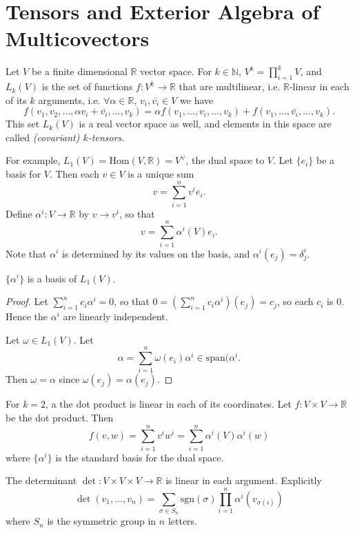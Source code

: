 \section{Tensors and Exterior Algebra of Multicovectors}

Let $V$ be a finite dimensional $\mathbb{R}$ vector space.
For $k \in \mathbb{N}$,
$V^k = \prod_{i=1}^k V$, and
$L_k(V)$ is the set of functions $f: V^k \to \mathbb{R}$ that are
multilinear, i.e. $\mathbb{R}$-linear in each of its $k$ arguments,
i.e. $\forall \alpha \in \mathbb{R}$, $v_i, \bar{v_i} \in V$ we have
$$
  f(v_1, v_2, \dots, \alpha v_i + \bar{v_i}, \dots, v_k)
= \alpha f(v_1, \dots, v_i, \dots, v_k)
+ f(v_1, \dots, \bar{v_i}, \dots, v_k).
$$
This set $L_k(V)$ is a real vector space as well, and elements in this
space are called \emph{(covariant) $k$-tensors}.

For example, $L_1(V) = \mathrm{Hom}(V, \mathbb{R}) = V^\vee$, the dual
space to $V$. Let $\{ e_i \}$ be a basis for $V$. Then each $v \in V$
is a unique sum
$$
  v
= \sum_{i=1}^n v^i e_i.
$$
Define $\alpha^i : V \to \mathbb{R}$ by $v \to v^i$, so that
$$
  v
= \sum_{i=1}^n \alpha^i(V) e_i.
$$
Note that $\alpha^i$ is determined by its values on the basis,
and $\alpha^i(e_j) = \delta_j^i$.

\begin{lemma}
$\{ \alpha^i \}$ is a basis of $L_1(V)$.
\end{lemma}

\begin{proof}
Let $\sum_{i=1}^n c_i \alpha^i = 0$, so that
$0 = \left(\sum_{i=1}^n c_i \alpha^i\right)(e_j) = c_j$,
so each $c_i$ is 0. Hence the $\alpha^i$ are linearly independent.

Let $\omega \in L_1(V)$. Let
$$
  \alpha
= \sum_{i=1}^n \omega(e_i) \alpha^i
\in \mathrm{span}(\alpha^i.
$$
Then $\omega = \alpha$ since $\omega(e_j) = \alpha(e_j)$.
\end{proof}

\begin{xmpl}
For $k = 2$, a the dot product is linear in each of its coordinates.
Let $f : V \times V \to \mathbb{R}$ be the dot product. Then
$$
  f(v, w)
= \sum_{i=1}^n v^i w^i
= \sum_{i=1}^n \alpha^i(V) \alpha^i(w)
$$
where $\{ \alpha^i \}$ is the standard basis for the dual space.
\end{xmpl}

\begin{xmpl}
The determinant $\det : V \times V \times V \to \mathbb{R}$ is linear
in each argument. Explicitly
$$
  \det (v_1, \dots, v_n)
= \sum_{\sigma \in S_n}
    \mathrm{sgn}(\sigma)
    \prod_{i=1}^n
      \alpha^i(v_{\sigma(i)})
$$
where $S_n$ is the symmetric group in $n$ letters.
\end{xmpl}

